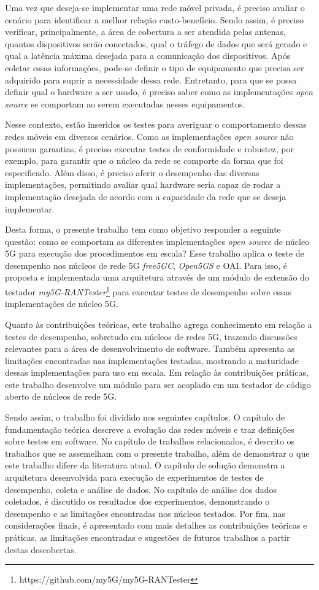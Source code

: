 Uma vez que deseja-se implementar uma rede móvel privada, é preciso avaliar o cenário para identificar a melhor relação custo-benefício.
Sendo assim, é preciso verificar, principalmente, a área de cobertura a ser atendida pelas antenas, quantos dispositivos serão conectados, qual o tráfego de dados que será gerado e qual a latência máxima desejada para a comunicação dos dispositivos.
Após coletar essas informações, pode-se definir o tipo de equipamento que precisa ser adquirido para suprir a necessidade dessa rede.
Entretanto, para que se possa definir qual o hardware a ser usado, é preciso saber como as implementações \textit{open source} se comportam ao serem executadas nesses equipamentos.

Nesse contexto, estão inseridos os testes para averiguar o comportamento dessas redes móveis em diversos cenários.
Como as implementações \textit{open source} não possuem garantias, é preciso executar testes de conformidade e robustez, por exemplo, para garantir que o núcleo da rede se comporte da forma que foi especificado.
Além disso, é preciso aferir o desempenho das diversas implementações, permitindo avaliar qual hardware seria capaz de rodar a implementação desejada de acordo com a capacidade da rede que se deseja implementar.

Desta forma, o presente trabalho tem como objetivo responder a seguinte questão: como se comportam as diferentes implementações \textit{open source} de núcleo 5G para execução dos procedimentos em escala?
Esse trabalho aplica o teste de desempenho nos núcleos de rede 5G \textit{free5GC}, \textit{Open5GS} e OAI. Para isso, é proposta e implementada uma arquitetura através de um módulo de extensão do testador \textit{my5G-RANTester}\footnote{https://github.com/my5G/my5G-RANTester} para executar testes de desempenho sobre essas implementações de núcleo 5G.

Quanto às contribuições teóricas, este trabalho agrega conhecimento em relação a testes de desempenho, sobretudo em núcleos de redes 5G, trazendo discussões relevantes para a área de desenvolvimento de software.
Também apresenta as limitações encontradas nas implementações testadas, mostrando a maturidade dessas implementações para uso em escala.
Em relação às contribuições práticas, este trabalho desenvolve um módulo para ser acoplado em um testador de código aberto de núcleos de rede 5G.

Sendo assim, o trabalho foi dividido nos seguintes capítulos.
O capítulo de fundamentação teórica descreve a evolução das redes móveis e traz definições sobre testes em software.
No capítulo de trabalhos relacionados, é descrito os trabalhos que se assemelham com o presente trabalho, além de demonstrar o que este trabalho difere da literatura atual.
O capítulo de solução demonstra a arquitetura desenvolvida para execução de experimentos de testes de desempenho, coleta e análise de dados.
No capítulo de análise dos dados coletados, é discutido os resultados dos experimentos, demonstrando o desempenho e as limitações encontradas nos núcleos testados.
Por fim, nas considerações finais, é apresentado com mais detalhes as contribuições teóricas e práticas, as limitações encontradas e sugestões de futuros trabalhos a partir destas descobertas.
